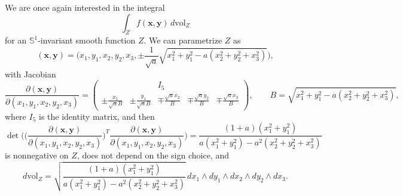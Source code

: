 \documentclass[twoside]{amsart}
\theoremstyle{definition}
\theoremstyle{remark}
\numberwithin{equation}{section}
\newcommand{\Sp}{\mathbb{S}}
\newcommand{\vol}{\text{vol}}
\begin{document}
We are once again interested in the integral
\begin{equation}
\label{eq:S1-1aa_SympInt0}
    \int_Z f(\mathbf{x},\mathbf{y}) \, d\vol_Z
\end{equation}
for an $\Sp^1$-invariant smooth function $Z$. We can parametrize $Z$ as
\[
    (\mathbf{x},\mathbf{y})
    =
    \Big(x_1, y_1, x_2, y_2, x_3, \pm\frac{1}{\sqrt{a}} \sqrt{x_1^2 + y_1^2 -  a(x_2^2 + y_2^2 + x_3^2)}\Big),
\]
with Jacobian
\[
    \frac{\partial (\mathbf{x}, \mathbf{y})}{ \partial (x_1, y_1, x_2, y_2, x_3)}
    =
    \begin{pmatrix}
           &&   I_5   &&
        \\
        \pm \frac{x_1}{\sqrt{a} B} & \pm \frac{y_1}{\sqrt{a} B} & \mp \frac{\sqrt{a} x_2}{B} & \mp \frac{\sqrt{a} y_2}{B} & \mp \frac{\sqrt{a} x_3}{B}
    \end{pmatrix},
    \qquad
    B = \sqrt{x_1^2 + y_1^2 -  a(x_2^2 + y_2^2 + x_3^2)},
\]
where $I_5$ is the identity matrix, and then
\[
    \det \Bigg(\Big(\frac{\partial (\mathbf{x}, \mathbf{y})}{ \partial (x_1, y_1, x_2, y_2, x_3)}\Big)^T
        \frac{\partial (\mathbf{x}, \mathbf{y})}{ \partial (x_1, y_1, x_2, y_2, x_3)}\Bigg)
    =      \frac{ (1 + a) (x_1^2 + y_1^2)}{a (x_1^2 + y_1^2) - a^2 (x_2^2 + y_2^2 + x_3^2)}
\]
is nonnegative on $Z$, does not depend on the sign choice, and
\begin{equation}
\label{eq:S1-1aa_SympVolForm}
    d\vol_Z = \sqrt{ \frac{ (1 + a) (x_1^2 + y_1^2)}{a (x_1^2 + y_1^2) - a^2 (x_2^2 + y_2^2 + x_3^2)} } \, dx_1 \wedge dy_1 \wedge dx_2 \wedge dy_2 \wedge dx_3.
\end{equation}
\end{document}
